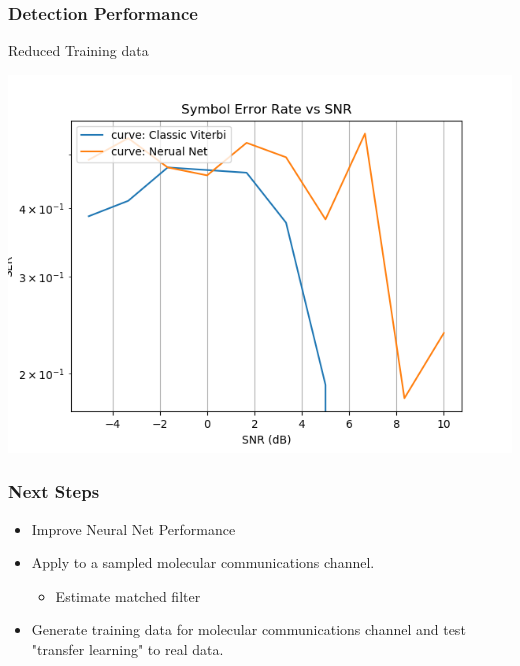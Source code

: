 \documentclass[10pt,tgadventor, onlymath]{beamer}
\begin{document}
\begin{frame}
\frametitle{Detection Performance}
	Reduced Training data

	\includegraphics[width=\textwidth]{low_training_data}
\end{frame}


\begin{frame}
\frametitle{Next Steps}
\begin{itemize}
\item Improve Neural Net Performance
\item Apply to a sampled molecular communications channel.
\begin{itemize}
\item Estimate matched filter
\end{itemize}
\item Generate training data for molecular communications channel and test "transfer learning" to real data.
\end{itemize}
\end{frame}
\end{document}
